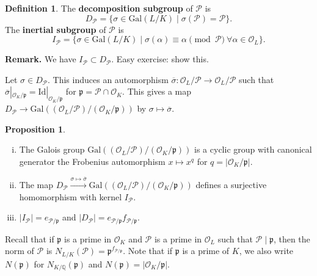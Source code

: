 \documentclass{article}
\theoremstyle{definition}
\newtheorem{prop}[theorem]{Proposition}
\newtheorem{defn}{Definition}[section]
\begin{document}
\begin{defn}
    The \textbf{decomposition subgroup} of $\mathcal{P}$ is $$D_{\mathcal{P}} = \{\sigma \in \text{Gal}(L/K) \mid \sigma(\mathcal{P})=\mathcal{P}\}.$$
    The \textbf{inertial subgroup} of $\mathcal{P}$ is \[
    I_{\mathcal{P}} = \{\sigma \in \text{Gal}(L/K) \mid \sigma(\alpha) \equiv \alpha \pmod{\mathcal{P}} ~\forall \alpha \in \mathcal{O}_L\}.
    \]
\end{defn}
\textbf{Remark.} We have $I_{\mathcal{P}} \subset D_{\mathcal{P}}$. Easy exercise: show this.
\vspace{1mm}
 
Let $\sigma \in D_\mathcal{P}$. This induces an automorphism $\overline{\sigma} : \mathcal{O}_L/\mathcal{P} \to \mathcal{O}_L/\mathcal{P}$ such that $\overline{\sigma}|_{\mathcal{O}_K/\mathfrak{p}} = \text{Id}|_{\mathcal{O}_K/\mathfrak{p}}$ for $\mathfrak{p} = \mathcal{P} \cap \mathcal{O}_K$. This gives a map $D_{\mathcal{P}} \to \text{Gal}((\mathcal{O}_L/\mathcal{P})/ (\mathcal{O}_K/\mathfrak{p}))$ by $\sigma \mapsto \overline{\sigma}$.

\begin{prop}\label{prop0.1}
    \begin{enumerate}[(i)]
        \item The Galois group $\text{Gal}((\mathcal{O}_L/\mathcal{P})/ (\mathcal{O}_K/\mathfrak{p}))$ is a cyclic group with canonical generator the Frobenius automorphism $x \mapsto x^q$ for $q = |\mathcal{O}_K/\mathfrak{p}|$.
        \item The map $D_{\mathcal{P}} \stackrel{\sigma \mapsto \overline{\sigma}}{\to} \text{Gal}((\mathcal{O}_L/\mathcal{P})/ (\mathcal{O}_K/\mathfrak{p}))$ defines a surjective homomorphism with kernel $I_{\mathcal{P}}$.
        \item $|I_{\mathcal{P}}| = e_{\mathcal{P}/\mathfrak{p}}$ and $|D_{\mathcal{P}}| = e_{\mathcal{P}/\mathfrak{p}}f_{\mathcal{P}/\mathfrak{p}}$.
    \end{enumerate}
\end{prop}
Recall that if $\mathfrak{p}$ is a prime in $\mathcal{O}_K$ and $\mathcal{P}$ is a prime in $\mathcal{O}_L$ such that $\mathcal{P} \mid  \mathfrak{p}$, then the norm of $\mathcal{P}$ is $N_{L/K}(\mathcal{P}) = \mathfrak{p}^{f_{\mathcal{P}/\mathfrak{p}}}$. Note that if $\mathfrak{p}$ is a prime of $K$, we also write $N(\mathfrak{p})$ for $N_{K/\mathbb{Q}}(\mathfrak{p})$ and $N(\mathfrak{p}) = |\mathcal{O}_K/\mathfrak{p}|$.
\end{document}
